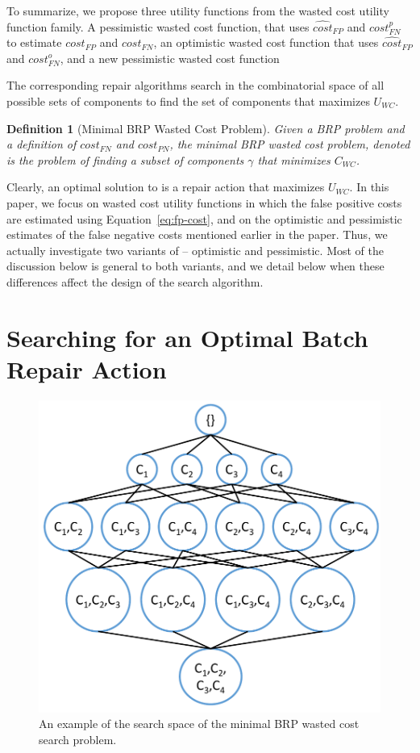 \documentclass[review]{elsarticle}
\newtheorem{definition}{Definition}
\begin{document}


To summarize, we propose three utility functions from the wasted cost utility function family. A pessimistic wasted cost function, that uses $\widehat{cost}_{FP}$ and $cost_{FN}^p$ to estimate $cost_{FP}$ and $cost_{FN}$, an optimistic wasted cost function that uses $\widehat{cost}_{FP}$ and $cost_{FN}^o$, and a new pessimistic wasted cost function %


The corresponding repair algorithms search in the combinatorial space of all possible sets of components to find the set of components that maximizes $U_{WC}$.

\begin{definition}[Minimal BRP Wasted Cost Problem]
Given a BRP problem and a definition of $cost_{FN}$ and $cost_{PN}$, 
the minimal BRP wasted cost problem, denoted \brps{} is the problem of 
finding a subset of components $\gamma$ that minimizes $C_{WC}$. 
\end{definition}
Clearly, an optimal solution to \brps{} is a repair action that maximizes $U_{WC}$. 
In this paper, we focus on wasted cost utility functions in which the false positive costs are estimated using Equation~\ref{eq:fp-cost}, and on the optimistic and pessimistic estimates of the false negative costs mentioned earlier in the paper. Thus, we actually investigate two variants of \brps{} -- optimistic and pessimistic. 
Most of the discussion below is general to both variants, and we detail below when these differences affect the design of the search algorithm. 

\section{Searching for an Optimal Batch Repair Action}
\begin{figure}%
\centering
\includegraphics[width=0.75\columnwidth]{subset-search-space_cropped.pdf}%
\caption{An example of the search space of the minimal BRP wasted cost search problem.}%
\label{fig:search-space}%
\end{figure}
\end{document}
